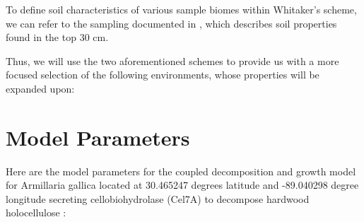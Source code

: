\documentclass{article}
\begin{document}
To define soil characteristics of various sample biomes within Whitaker's scheme, we can refer to the sampling documented in {}, which describes soil properties found in the top 30 cm.

Thus, we will use the two aforementioned schemes to provide us with a more focused selection of the following environments, whose properties will be expanded upon:


\newpage
\section{Model Parameters}

Here are the model parameters for the coupled decomposition and growth model for Armillaria gallica located at 30.465247 degrees latitude and -89.040298 degree longitude secreting cellobiohydrolase (Cel7A) to decompose hardwood holocellulose \cite{Maynard2019} \cite{Kari2014}:
\end{document}
